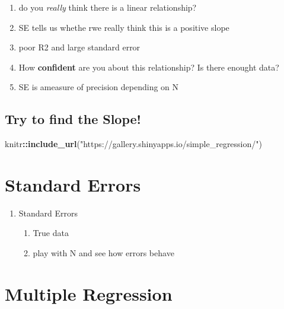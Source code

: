 \documentclass[]{book}
\newenvironment{Shaded}{\begin{snugshade}}{\end{snugshade}}
\newcommand{\KeywordTok}[1]{\textcolor[rgb]{0.13,0.29,0.53}{\textbf{#1}}}
\newcommand{\StringTok}[1]{\textcolor[rgb]{0.31,0.60,0.02}{#1}}
\newcommand{\OperatorTok}[1]{\textcolor[rgb]{0.81,0.36,0.00}{\textbf{#1}}}
\newcommand{\NormalTok}[1]{#1}
\providecommand{\tightlist}{%
  \setlength{\itemsep}{0pt}\setlength{\parskip}{0pt}}
\theoremstyle{definition}
\theoremstyle{definition}
\theoremstyle{definition}
\theoremstyle{remark}
\begin{document}
\begin{enumerate}
  \begin{enumerate}
  \def\labelenumii{\arabic{enumii}.}
  \tightlist
  \item
    do you \emph{really} think there is a linear relationship?
  \item
    SE tells us whethe rwe really think this is a positive slope
  \item
    poor R2 and large standard error
  \item
    How \textbf{confident} are you about this relationship? Is there
    enought data?
  \item
    SE is ameasure of precision depending on N
  \end{enumerate}
\end{enumerate}

\section{Try to find the Slope!}\label{try-to-find-the-slope}

\begin{Shaded}
\begin{Highlighting}[]
\NormalTok{knitr}\OperatorTok{::}\KeywordTok{include_url}\NormalTok{(}\StringTok{"https://gallery.shinyapps.io/simple_regression/"}\NormalTok{)}
\end{Highlighting}
\end{Shaded}

\chapter{Standard Errors}\label{std-errors}

\begin{enumerate}
\def\labelenumi{\arabic{enumi}.}
\tightlist
\item
  Standard Errors

  \begin{enumerate}
  \def\labelenumii{\arabic{enumii}.}
  \tightlist
  \item
    True data
  \item
    play with N and see how errors behave
  \end{enumerate}
\end{enumerate}

\chapter{Multiple Regression}\label{multiple-reg}
\end{document}
